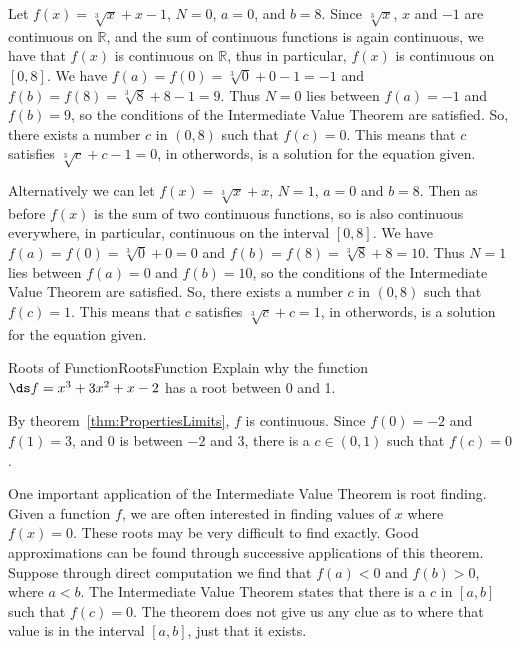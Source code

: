 \begin{solution} 
Let $f(x)=\sqrt[3]{x}+x-1$, $N=0$, $a=0$, and $b=8$.
Since $\sqrt[3]{x}$, $x$ and $-1$ are continuous on $\mathbb{R}$, and the sum of continuous functions is again continuous, we have that $f(x)$ is continuous on $\mathbb{R}$, thus in particular, $f(x)$ is continuous on $[0,8]$.
We have $f(a)=f(0)=\sqrt[3]{0}+0-1=-1$ and $f(b)=f(8)=\sqrt[3]{8}+8-1=9$.
Thus $N=0$ lies between $f(a)=-1$ and $f(b)=9$, so the conditions of the Intermediate Value Theorem are satisfied.
So, there exists a number $c$ in $(0,8)$ such that $f(c)=0$.
This means that $c$ satisfies $\sqrt[3]{c}+c-1=0$, in otherwords, is a solution for the equation given.

Alternatively we can let $f(x)=\sqrt[3]{x}+x$, $N=1$, $a=0$ and $b=8$.
Then as before $f(x)$ is the sum of two continuous functions, so is also continuous everywhere, in particular, continuous on the interval $[0,8]$.
We have $f(a)=f(0)=\sqrt[3]{0}+0=0$ and $f(b)=f(8)=\sqrt[3]{8}+8=10$.
Thus $N=1$ lies between $f(a)=0$ and $f(b)=10$, so the conditions of the Intermediate Value Theorem are satisfied.
So, there exists a number $c$ in $(0,8)$ such that $f(c)=1$.
This means that $c$ satisfies $\sqrt[3]{c}+c=1$, in otherwords, is a solution for the equation given.
\end{solution}

\begin{example}{Roots of Function}{RootsFunction}
Explain why the function $\ds f=x^3 + 3x^2+x-2$ has a root between 0
and 1.
\end{example}

\begin{solution}
By theorem~\ref{thm:PropertiesLimits}, $f$ is continuous.
Since $f(0)=-2$ and $f(1)=3$, and $0$ is between $-2$ and $3$, there
is a $c\in(0,1)$ such that $f(c)=0$.
\end{solution}




One important application of the Intermediate Value Theorem is root finding. Given a function $f$, we are often interested in finding values of $x$ where $f(x) = 0$. These roots may be very difficult to find exactly. Good approximations can be found through successive applications of this theorem. Suppose through direct computation we find that $f(a) <0 $ and $f(b)>0$, where $a<b$. The Intermediate Value Theorem states that there is a $c$ in $[a,b]$ such that $f(c) = 0$. The theorem does not give us any clue as to where that value is in the interval $[a,b]$, just that it exists. 

